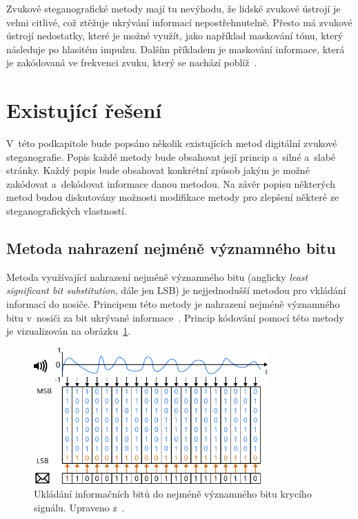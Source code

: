 Zvukové steganografické metody mají tu nevýhodu, že lidské zvukové ústrojí je
velmi citlivé, což ztěžuje ukrývání informací nepostřehnutelně. Přesto má
zvukové ústrojí nedostatky, které je možné využít, jako například maskování
tónu, který následuje po hlasitém impulzu. Dalším příkladem je maskování
informace, která je zakódovaná ve frekvenci zvuku, který se nachází
poblíž~\cite{Dutta2020}.

\section{Existující řešení}
\label{sec:existing-methods}

V~této podkapitole bude popsáno několik existujících metod digitální zvukové
steganografie. Popis každé metody bude obsahovat její princip a~silné a~slabé
stránky. Každý popis bude obsahovat konkrétní způsob jakým je možné zakódovat
a~dekódovat informace danou metodou. Na závěr popisu některých metod budou
diskutovány možnosti modifikace metody pro zlepšení některé ze
steganografických vlastností.

\subsection*{Metoda nahrazení nejméně významného bitu}
\label{sub:lsb}

Metoda využívající nahrazení nejméně významného bitu (anglicky \textit{least
significant bit substitution}, dále jen LSB) je nejjednodušší metodou pro
vkládání informací do nosiče. Principem této metody je nahrazení nejméně
významného bitu v~nosiči za bit ukrývané informace~\cite{Dutta2020}. Princip
kódování pomocí této metody je vizualizován na obrázku~\ref{pic:lsb-diagram}.

\begin{figure}[hbt]
    \centering
    \includegraphics[width=0.8\textwidth]{obrazky/lsb-diagram.pdf}
    \caption{Ukládání informačních bitů do nejméně významného bitu krycího
    signálu. Upraveno z~\cite{Djebbar2012}.}
    \label{pic:lsb-diagram}
\end{figure}

